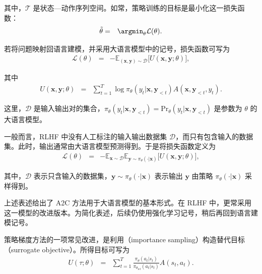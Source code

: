 \noindent 其中，$\mathcal{T}$ 是状态—动作序列空间。如常，策略训练的目标是最小化这一损失函数：
\begin{eqnarray}
\tilde{\theta} & = & \argmin_{\theta} \mathcal{L}(\theta).
\end{eqnarray}

若将问题映射回语言建模，并采用大语言模型中的记号，损失函数可写为
\begin{eqnarray}
\mathcal{L}(\theta) & = & -\mathbb{E}_{(\mathbf{x},\mathbf{y}) \sim \mathcal{D}} \big[ U(\mathbf{x},\mathbf{y};\theta) \big],
\end{eqnarray}

\noindent 其中
\begin{eqnarray}
U(\mathbf{x},\mathbf{y};\theta) & = & \sum_{t=1}^{T} \log \pi_{\theta}(y_t|\mathbf{x},\mathbf{y}_{<t}) A(\mathbf{x},\mathbf{y}_{<t},y_t).
\end{eqnarray}

\noindent 这里，$\mathcal{D}$ 是输入输出对的集合，$\pi_{\theta}(y_t|\mathbf{x},\mathbf{y}_{<t}) = \mathrm{Pr}_{\theta}(y_t|\mathbf{x},\mathbf{y}_{<t})$ 是参数为 $\theta$ 的大语言模型。

一般而言，RLHF 中没有人工标注的输入输出数据集 $\mathcal{D}$，而只有包含输入的数据集。此时，输出通常由大语言模型预测得到。于是将损失函数定义为
\begin{eqnarray}
\mathcal{L}(\theta) & = & -\mathbb{E}_{\mathbf{x} \sim \mathcal{D}} \mathbb{E}_{\mathbf{y} \sim \pi_{\theta}(\cdot|\mathbf{x})} \big[ U(\mathbf{x},\mathbf{y};\theta) \big],
\end{eqnarray}

\noindent 其中，$\mathcal{D}$ 表示只含输入的数据集，$\mathbf{y} \sim \pi_{\theta}(\cdot|\mathbf{x})$ 表示输出 $\mathbf{y}$ 由策略 $\pi_{\theta}(\cdot|\mathbf{x})$ 采样得到。

上述表述给出了 A2C 方法用于大语言模型的基本形式。在 RLHF 中，更常采用这一模型的改进版本。为简化表述，后续仍使用强化学习记号，稍后再回到语言建模记号。

策略梯度方法的一项常见改进，是利用（importance sampling）构造替代目标（surrogate objective）。所得目标可写为
\begin{eqnarray}
U(\tau;\theta) & = &  \sum_{t=1}^{T} \frac{\pi_{\theta}(a_t|s_t)}{\pi_{\theta_{\mathrm{ref}}}(a_t|s_t)} A(s_t,a_t).
\end{eqnarray}

